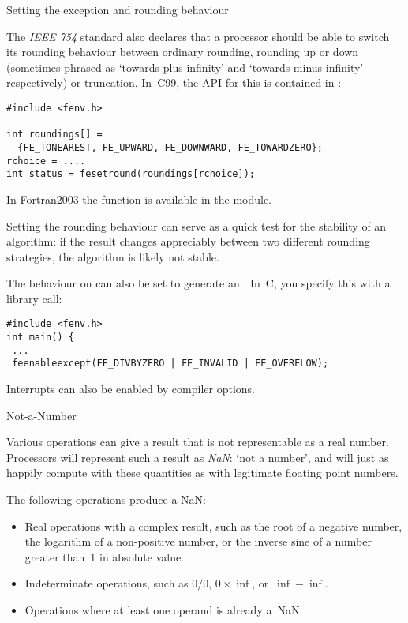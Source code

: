  {Setting the exception and rounding behaviour}
\label{sec:fenvh}

The \emph{IEEE 754}
standard also declares that a processor should be
able to switch its rounding behaviour between ordinary rounding,
rounding up or down (sometimes phrased as `towards plus infinity'
and `towards minus infinity' respectively) or truncation.
In~C99, the API for this is contained in :
\begin{verbatim}
#include <fenv.h>

int roundings[] =
  {FE_TONEAREST, FE_UPWARD, FE_DOWNWARD, FE_TOWARDZERO};
rchoice = ....
int status = fesetround(roundings[rchoice]);            
\end{verbatim}
In Fortran2003 the function 
is available in the  module.

Setting the rounding behaviour can serve as a quick test for the stability
of an algorithm: if the result changes appreciably between two different
rounding strategies, the algorithm is likely not stable.

The behaviour on  can also be set to generate an
.
In~C, you specify this with a library call:
\begin{verbatim}
#include <fenv.h>
int main() { 
 ...
 feenableexcept(FE_DIVBYZERO | FE_INVALID | FE_OVERFLOW);
\end{verbatim}
Interrupts can also be enabled by compiler options.

 {Not-a-Number}
\label{sec:754nan}

Various operations can give a result that is not representable as a
real number. Processors will represent such a result as \emph{NaN}:
`not a number', and will just as happily compute with these quantities
as with legitimate floating point numbers.

The following operations produce a NaN:
\begin{itemize}
\item Real operations with a complex result, such as the root of a
  negative number, the logarithm of a non-positive number, or the
  inverse sine of a number greater than~1 in absolute value.
\item Indeterminate operations, such as $0/0$, $0\times\inf$,
  or~$\inf-\inf$.
\item Operations where at least one operand is already a~NaN.
\end{itemize}

